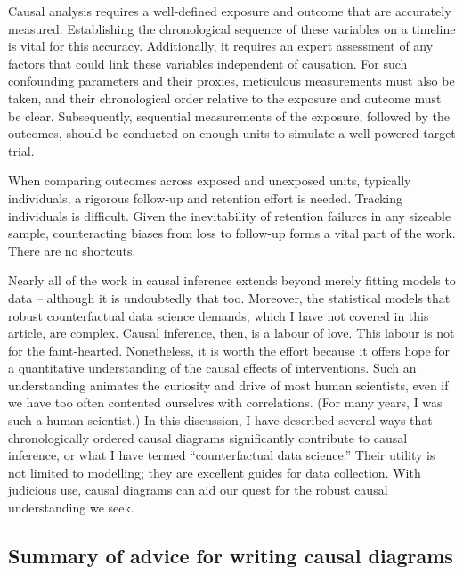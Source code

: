 \documentclass[
  singlecolumn]{report}
\begin{document}
Causal analysis requires a well-defined exposure and outcome that are
accurately measured. Establishing the chronological sequence of these
variables on a timeline is vital for this accuracy. Additionally, it
requires an expert assessment of any factors that could link these
variables independent of causation. For such confounding parameters and
their proxies, meticulous measurements must also be taken, and their
chronological order relative to the exposure and outcome must be clear.
Subsequently, sequential measurements of the exposure, followed by the
outcomes, should be conducted on enough units to simulate a well-powered
target trial.

When comparing outcomes across exposed and unexposed units, typically
individuals, a rigorous follow-up and retention effort is needed.
Tracking individuals is difficult. Given the inevitability of retention
failures in any sizeable sample, counteracting biases from loss to
follow-up forms a vital part of the work. There are no shortcuts.

Nearly all of the work in causal inference extends beyond merely fitting
models to data -- although it is undoubtedly that too. Moreover, the
statistical models that robust counterfactual data science demands,
which I have not covered in this article, are complex. Causal inference,
then, is a labour of love. This labour is not for the faint-hearted.
Nonetheless, it is worth the effort because it offers hope for a
quantitative understanding of the causal effects of interventions. Such
an understanding animates the curiosity and drive of most human
scientists, even if we have too often contented ourselves with
correlations. (For many years, I was such a human scientist.) In this
discussion, I have described several ways that chronologically ordered
causal diagrams significantly contribute to causal inference, or what I
have termed ``counterfactual data science.'' Their utility is not
limited to modelling; they are excellent guides for data collection.
With judicious use, causal diagrams can aid our quest for the robust
causal understanding we seek.

\hypertarget{summary-of-advice-for-writing-causal-diagrams}{%
\subsection{Summary of advice for writing causal
diagrams}\label{summary-of-advice-for-writing-causal-diagrams}}
\end{document}
